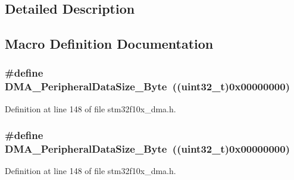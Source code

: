 \subsection{Detailed Description}


\subsection{Macro Definition Documentation}
\subsubsection[{\texorpdfstring{D\+M\+A\+\_\+\+Peripheral\+Data\+Size\+\_\+\+Byte}{DMA_PeripheralDataSize_Byte}}]{\setlength{\rightskip}{0pt plus 5cm}\#define D\+M\+A\+\_\+\+Peripheral\+Data\+Size\+\_\+\+Byte~(({\bf uint32\+\_\+t})0x00000000)}\hypertarget{group___d_m_a__peripheral__data__size_ga7577035ae4ff413164000227a8cea346}{}\label{group___d_m_a__peripheral__data__size_ga7577035ae4ff413164000227a8cea346}


Definition at line 148 of file stm32f10x\+\_\+dma.\+h.

\subsubsection[{\texorpdfstring{D\+M\+A\+\_\+\+Peripheral\+Data\+Size\+\_\+\+Byte}{DMA_PeripheralDataSize_Byte}}]{\setlength{\rightskip}{0pt plus 5cm}\#define D\+M\+A\+\_\+\+Peripheral\+Data\+Size\+\_\+\+Byte~(({\bf uint32\+\_\+t})0x00000000)}\hypertarget{group___d_m_a__peripheral__data__size_ga7577035ae4ff413164000227a8cea346}{}\label{group___d_m_a__peripheral__data__size_ga7577035ae4ff413164000227a8cea346}


Definition at line 148 of file stm32f10x\+\_\+dma.\+h.

